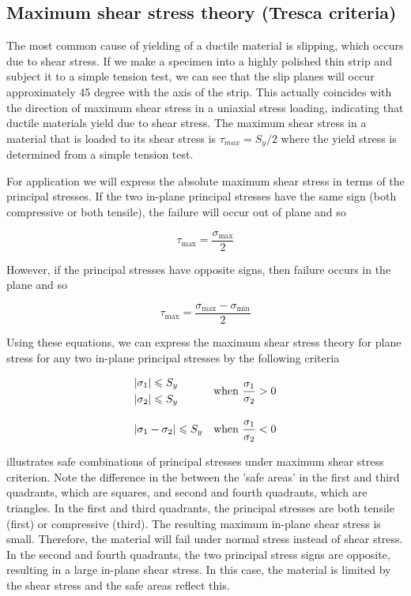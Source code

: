 \documentclass[a4paper,openany,12pt]{book}
\begin{document}
\subsection{Maximum shear stress theory (Tresca criteria)}
\label{sec:orgbb19ee9}
The most common cause of yielding of a ductile material is slipping,
which occurs due to shear stress. If we make a specimen into a highly
polished thin strip and subject it to a simple tension test, we can see
that the slip planes will occur approximately 45 degree with the axis of
the strip. This actually coincides with the direction of maximum shear
stress in a uniaxial stress loading, indicating that ductile materials
yield due to shear stress. The maximum shear stress in a material that
is loaded to its shear stress is \(\tau_{max} = S_y / 2\) where the yield
stress is determined from a simple tension test.

For application we will express the absolute maximum shear stress in
terms of the principal stresses. If the two in-plane principal stresses
have the same sign (both compressive or both tensile), the failure will
occur out of plane and so

$$\tau _{\max } = \frac{\sigma _{\max }}{2}$$

However, if the principal stresses have opposite signs, then failure
occurs in the plane and so

$$\tau _{\max } = \frac{\sigma_{\max } - \sigma _{\min }}{2}$$

Using these equations, we can express the maximum shear stress theory
for plane stress for any two in-plane principal stresses by the
following criteria

$$\begin{array}{l l}
    \begin{gathered}
      \left| \sigma_1 \right| \leqslant S_y \hfill \\
      \left| \sigma_2 \right| \leqslant S_y \hfill \\ 
    \end{gathered}  &\text{when } \dfrac{\sigma _1}{\sigma _2} > 0  \\[20pt]
    \left| \sigma _1 - \sigma _2 \right| \leqslant S_y &\text{when } \dfrac{\sigma _1}{\sigma _2} < 0 \\ 
  \end{array}$$


illustrates safe combinations of principal stresses under maximum shear
stress criterion. Note the difference in the between the 'safe areas' in
the first and third quadrants, which are squares, and second and fourth
quadrants, which are triangles. In the first and third quadrants, the
principal stresses are both tensile (first) or compressive (third). The
resulting maximum in-plane shear stress is small. Therefore, the
material will fail under normal stress instead of shear stress. In the
second and fourth quadrants, the two principal stress signs are
opposite, resulting in a large in-plane shear stress. In this case, the
material is limited by the shear stress and the safe areas reflect this.
\end{document}

